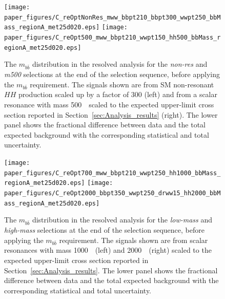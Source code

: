 \begin{figure}
\begin{flushleft}
\texttt{[image: paper\_figures/C\_reOptNonRes\_mww\_bbpt210\_bbpt300\_wwpt250\_bbMass\_regionA\_met25d020.eps]}
\texttt{[image: paper\_figures/C\_reOpt500\_mww\_bbpt210\_wwpt150\_hh500\_bbMass\_regionA\_met25d020.eps]}
\end{flushleft}
\caption{The $m_{b \bar{b}}$ distribution in the resolved analysis for the \emph{non-res} and \emph{m500} selections at the end of the
 selection sequence, before applying the $m_{b \bar{b}}$ requirement. The signals shown
 are from SM non-resonant $HH$ production scaled up by a factor of 300 (left) and from a scalar resonance with mass 500~\GeV\ scaled to the expected upper-limit
 cross section reported in Section~\ref{sec:Analysis_results} (right).  The lower panel shows the fractional difference
  between data and the total expected background
 with the corresponding statistical and total uncertainty.
} \label{fig:mbb_1}
\end{figure}
 
\begin{figure}
\begin{flushleft}
\texttt{[image: paper\_figures/C\_reOpt700\_mww\_bbpt210\_wwpt250\_hh1000\_bbMass\_regionA\_met25d020.eps]}
\texttt{[image: paper\_figures/C\_reOpt2000\_bbpt350\_wwpt250\_drww15\_hh2000\_bbMass\_regionA\_met25d020.eps]}
\end{flushleft}
\caption{The $m_{b \bar{b}}$ distribution in the resolved analysis for the
 \emph{low-mass} and \emph{high-mass} selections at the end of the
 selection sequence, before applying the $m_{b \bar{b}}$ requirement. The signals shown
 are from scalar resonances with mass 1000~\GeV\ (left) and 2000~\GeV\ (right)
 scaled to the expected upper-limit cross section reported in
 Section~\ref{sec:Analysis_results}.  The lower panel shows the fractional difference
  between data and the total expected background
 with the corresponding statistical and total uncertainty.} \label{fig:mbb_2}
\end{figure}
 
 
